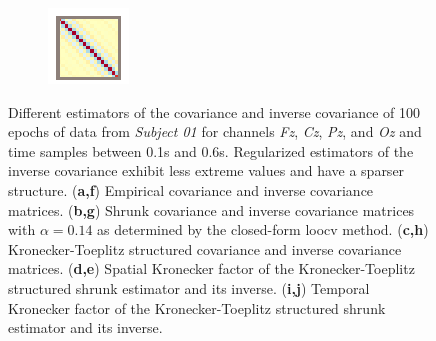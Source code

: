 \begin{figure}
\begin{minipage}[b]{\textwidth/10}
\begin{subfigure}{\textwidth}
        \caption{}
      \end{subfigure}\vfill%
      \begin{subfigure}{\textwidth}
  		  \includegraphics[width=\linewidth]{figures/stbf_struct/covs-9.eps}
        \caption{}
      \end{subfigure}\hfill%
    \end{minipage}



    \caption[Estimated covariance and inverse covariance.]{Different estimators of the covariance and inverse covariance
			of 100 epochs of data from \textit{Subject 01} for channels
			\textit{Fz}, \textit{Cz}, \textit{Pz}, and \textit{Oz} and time samples between 0.1s and 0.6s.
			Regularized estimators of the inverse covariance exhibit less extreme values and have a sparser structure.
			(\textbf{a,f}) Empirical covariance and inverse covariance matrices.
			(\textbf{b,g}) Shrunk covariance and inverse covariance matrices with $\alpha=0.14$ as
			determined by the closed-form \ac{loocv} method. (\textbf{c,h}) Kronecker-Toeplitz
			structured covariance and inverse covariance matrices.
			(\textbf{d,e}) Spatial Kronecker factor of the Kronecker-Toeplitz structured shrunk estimator and its inverse.
			(\textbf{i,j}) Temporal Kronecker factor of the Kronecker-Toeplitz structured shrunk estimator and its inverse.}
		\label{fig:kronlda-covs}
	\end{figure}

